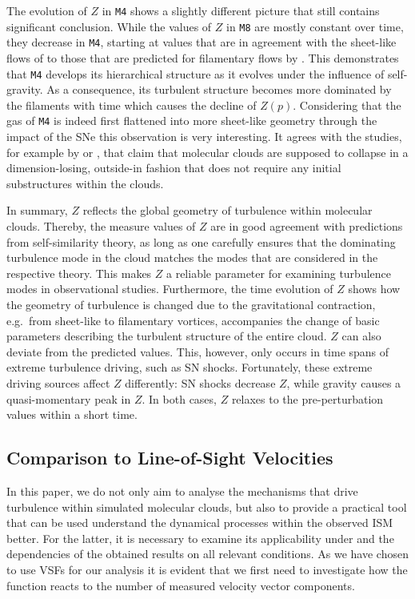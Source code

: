The evolution of $Z$ in \texttt{M4} shows a slightly different picture that still contains significant conclusion.
While the values of $Z$ in \texttt{M8} are mostly constant over time, they decrease in \texttt{M4}, starting at values that are in agreement with the sheet-like flows of \citet{Boldyrev2002} to those that are predicted for filamentary flows by \citet{She1994}. 
This demonstrates that \texttt{M4} develops its hierarchical structure as it evolves under the influence of self-gravity. 
As a consequence, its turbulent structure becomes more dominated by the filaments with time which causes the decline of $Z(p)$.
Considering that the gas of \texttt{M4} is indeed first flattened into more sheet-like geometry through the impact of the SNe \citep{IbanezMejia2017} this observation is very interesting.
It agrees with the studies, for example by \citet{Lin1965} or \citet{McKee2007}, that claim that molecular clouds are supposed to collapse in a dimension-losing, outside-in fashion that does not require any initial substructures within the clouds.

In summary, $Z$ reflects the global geometry of turbulence within molecular clouds. 
Thereby, the measure values of $Z$ are in good agreement with predictions from self-similarity theory, as long as one carefully ensures that the dominating turbulence mode in the cloud matches the modes that are considered in the respective theory.
This makes $Z$ a reliable parameter for examining turbulence modes in observational studies.
Furthermore, the time evolution of $Z$ shows how the geometry of turbulence is changed due to the gravitational contraction, e.g.~from sheet-like to filamentary vortices, accompanies the change of basic parameters describing the turbulent structure of the entire cloud. 
$Z$ can also deviate from the predicted values. 
This, however, only occurs in time spans of extreme turbulence driving, such as SN shocks.
Fortunately, these extreme driving sources affect $Z$ differently:
SN shocks decrease $Z$, while gravity causes a quasi-momentary peak in $Z$.
In both cases, $Z$ relaxes to the pre-perturbation values within a short time.

\subsection{Comparison to Line-of-Sight Velocities}\label{discussion:1d}

In this paper, we do not only aim to analyse the mechanisms that drive turbulence within simulated molecular clouds, but also to provide a practical tool that can be used understand the dynamical processes within the observed ISM better.
For the latter, it is necessary to examine its applicability under and the dependencies of the obtained results on all relevant conditions. 
As we have chosen to use VSFs for our analysis it is evident that we first need to investigate how the function reacts to the number of measured velocity vector components. 

